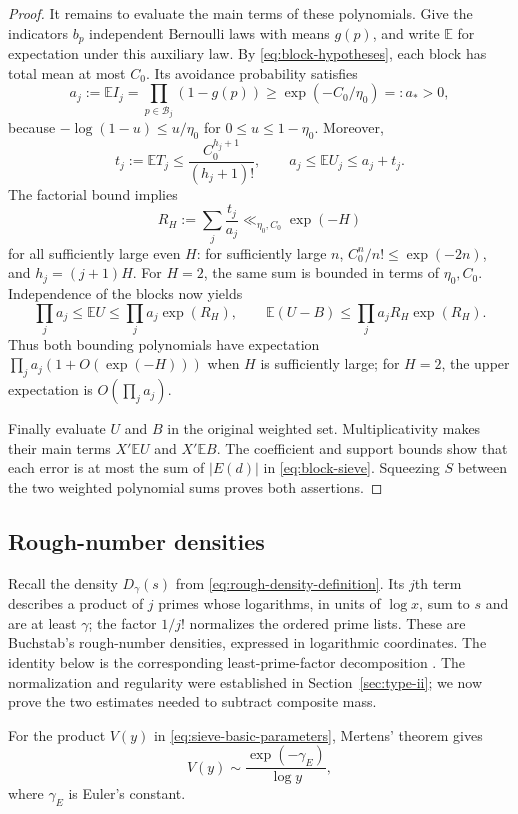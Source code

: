 \begin{proof}
It remains to evaluate the main terms of these polynomials.
Give the indicators $b_p$ independent Bernoulli laws with means
$g(p)$, and write $\mathbb E$ for expectation under this auxiliary
law. By \eqref{eq:block-hypotheses}, each block has total mean at
most $C_0$. Its avoidance probability satisfies
\[
 a_j:=\mathbb E I_j=\prod_{p\in\mathcal B_j}(1-g(p))
       \ge \exp(-C_0/\eta_0)=:a_*>0,
\]
because $-\log(1-u)\le u/\eta_0$ for $0\le u\le1-\eta_0$.
Moreover,
\[
 t_j:=\mathbb E T_j\le\frac{C_0^{h_j+1}}{(h_j+1)!},
 \qquad a_j\le\mathbb E U_j\le a_j+t_j.
\]
The factorial bound implies
\[
 R_H:=\sum_j\frac{t_j}{a_j}\ll_{\eta_0,C_0}\exp(-H)
\]
for all sufficiently large even $H$: for sufficiently large $n$,
$C_0^n/n!\le\exp(-2n)$, and $h_j=(j+1)H$.
For $H=2$, the same sum is bounded in terms of $\eta_0,C_0$.
Independence of the blocks now yields
\[
 \prod_ja_j\le\mathbb E U\le \prod_ja_j\exp(R_H),
 \qquad
 \mathbb E(U-B)\le \prod_ja_j R_H\exp(R_H).
\]
Thus both bounding polynomials have expectation
$\prod_ja_j(1+O(\exp(-H)))$ when $H$ is sufficiently large;
for $H=2$, the upper expectation is $O(\prod_ja_j)$.

Finally evaluate $U$ and $B$ in the original weighted set.
Multiplicativity makes their main terms $X'\mathbb E U$ and
$X'\mathbb E B$. The coefficient and support bounds show that
each error is at most the sum of $|E(d)|$ in
\eqref{eq:block-sieve}. Squeezing $S$ between the two weighted
polynomial sums proves both assertions.
\end{proof}

\subsection{Rough-number densities}

Recall the density $D_\gamma(s)$ from
\eqref{eq:rough-density-definition}. Its $j$th term describes a
product of $j$ primes whose logarithms, in units of $\log x$, sum
to $s$ and are at least $\gamma$; the factor $1/j!$ normalizes the
ordered prime lists. These are Buchstab's rough-number densities,
expressed in logarithmic coordinates. The identity below is the
corresponding least-prime-factor decomposition \cite{Buchstab1937}.
The normalization and regularity were established in
Section~\ref{sec:type-ii}; we now prove the two estimates needed to
subtract composite mass.

For the product $V(y)$ in \eqref{eq:sieve-basic-parameters},
Mertens' theorem gives
\begin{equation}\label{eq:mertens-product}
 V(y)\sim\frac{\exp(-\gamma_E)}{\log y},
\end{equation}
where $\gamma_E$ is Euler's constant.

